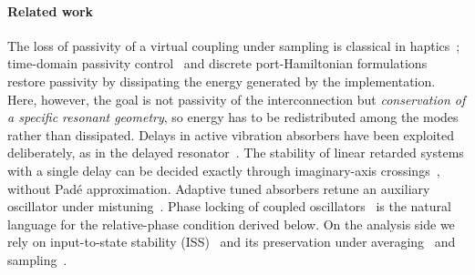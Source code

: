 \paragraph*{Related work}
The loss of passivity of a virtual coupling under sampling is classical in
haptics~\citep{colgate1994passivity}; time-domain passivity
control~\citep{hannaford2002time} and discrete port-Hamiltonian
formulations~\citep{stramigioli2005sampled} restore passivity by dissipating the
energy generated by the implementation.
Here, however, the goal is not passivity of the interconnection but
\emph{conservation of a specific resonant geometry}, so energy has to be
redistributed among the modes rather than dissipated.
Delays in active vibration absorbers have been exploited deliberately, as in the
delayed resonator~\citep{olgac1994novel}.
The stability of linear retarded systems with a single delay can be decided
exactly through imaginary-axis crossings~\citep{cooke1986zeroes,
walton1987direct,olgac2002exact,michiels2014stability}, without Pad\'e
approximation.
Adaptive tuned absorbers retune an auxiliary oscillator under
mistuning~\citep{bonello2011adaptive}.
Phase locking of coupled oscillators~\citep{adler1946study,
pikovsky2001synchronization} is the natural language for the relative-phase
condition derived below.
On the analysis side we rely on input-to-state stability
(ISS)~\citep{sontag1989smooth,sontag2008input} and its preservation under
averaging~\citep{nesic2001input,teel2003unified} and
sampling~\citep{nesic2004framework}.

